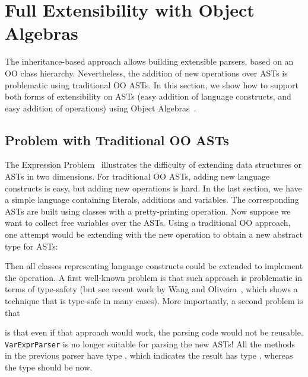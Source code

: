 \section{Full Extensibility with Object Algebras}\label{sec:algebrasandparsing}

The inheritance-based approach allows building extensible parsers, based on an OO class hierarchy.  Nevertheless, the addition of new operations over ASTs is problematic using traditional OO ASTs. In this section, we
show how to support both forms of extensibility on ASTs (easy
addition of language constructs, and easy addition of operations)
using Object Algebras~\cite{Oliveira:2012}.

\subsection{Problem with Traditional OO ASTs}\label{subsec:problemwithoutoa}

The Expression Problem~\cite{wadler1998expression} illustrates the
difficulty of extending data structures or ASTs in two dimensions. For
traditional OO ASTs, adding new language constructs is easy, but
adding new operations is hard. In the last section, we have a simple
language containing literals, additions and variables. The
corresponding ASTs are built using classes with a pretty-printing
operation. Now suppose we want to collect free variables over the
ASTs. Using a traditional OO approach, one attempt would be extending
 with the new operation to obtain a new abstract type
for ASTs:


\noindent Then all classes representing language constructs could be 
extended to implement the operation. A first well-known problem is that such
approach is problematic in terms of type-safety (but see recent work 
by Wang and Oliveira~\cite{wang2016expression}, which shows a technique that is type-safe
in many cases). More importantly, a second problem is that
\begin{comment}
But then programmers have to define a new class for each construct by
extending the old class with \lstinline{FVarsExpr}, and implementing
the corresponding \lstinline{fVars} method:


Besides introducing boilerplate code, more classes have to be defined
along with future extensions. They pollutes the namespace heavily.
More importantly, 
\end{comment}
is that even if that approach would work, the parsing code would not
be reusable. \lstinline{VarExprParser} is no longer suitable for parsing the new ASTs! All the methods in the previous parser have type , which indicates the result has type , whereas the type should be  now.

